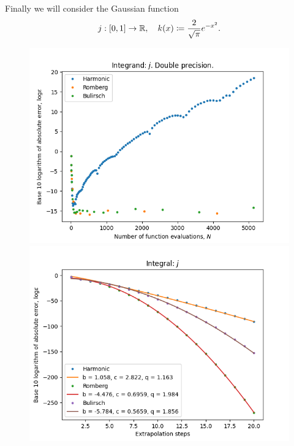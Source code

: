 Finally we will consider the Gaussian function
\[
j: [0,1]\rightarrow \mathbb{R}, \quad k(x) \coloneqq \frac{2}{\sqrt{\pi}} e^{-x^2}.
\]
\begin{figure}[H]
\centering
\begin{minipage}{0.45\textwidth}
\centering
\includegraphics[scale=0.45]{romberg_plots/gaussian.png}
\end{minipage}
\begin{minipage}{0.45\textwidth}
\centering
\includegraphics[scale=0.45]{romberg_plots/gaussian_hp_steps.png}
\end{minipage}
\end{figure}

